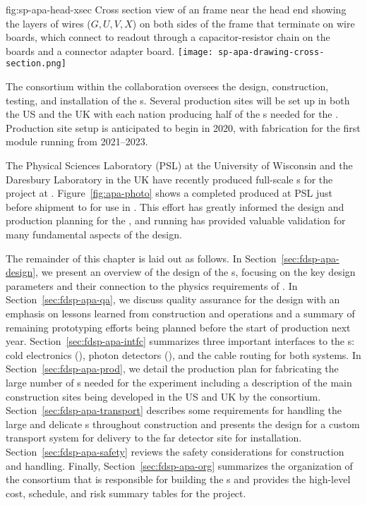 \begin{dunefigure}{fig:sp-apa-head-xsec}
{Cross section view of an  frame near the head end showing the layers of wires ($G,U,V,X$) on both sides of the frame that terminate on wire boards, which connect to  readout  through a capacitor-resistor chain on the  boards and a connector adapter board.} 
\texttt{[image: sp-apa-drawing-cross-section.png]} 
\end{dunefigure} 

The  consortium within the  collaboration oversees the design, construction, testing, and installation of the s. Several  production sites will be set up in both the US and the UK with each nation producing  half of the s needed for the %
.  Production site setup is anticipated to begin in 2020, with  fabrication for the first \nominalmodsize {} module running from 2021--2023.  

The Physical Sciences Laboratory (PSL) at the University of Wisconsin and the Daresbury Laboratory in the UK have recently produced full-scale s for the  project at . Figure~\ref{fig:apa-photo} shows a completed  produced at PSL just before shipment to  for use in . This effort has greatly informed the design and production planning for the  , and  running has provided valuable validation for many fundamental aspects of the   design. 


The remainder of this chapter is laid out as follows.  In Section~\ref{sec:fdsp-apa-design}, we present an overview of the design of the s, focusing on the key design parameters and their connection to the physics requirements of .  In Section~\ref{sec:fdsp-apa-qa}, we discuss quality assurance for the design with an emphasis on lessons learned from  construction and operations and a summary of remaining prototyping efforts being planned before the start of production next year. Section~\ref{sec:fdsp-apa-intfc} summarizes three important interfaces to the s:  cold electronics (), photon detectors (), and the cable routing for both systems.  In Section~\ref{sec:fdsp-apa-prod}, we detail the production plan for fabricating the large number of s needed for the experiment including a description of the main construction sites being developed in the US and UK by the  consortium.  Section~\ref{sec:fdsp-apa-transport} describes some requirements for handling the large and delicate s throughout construction and presents the design for a custom transport system for delivery to the far detector site for installation. Section~\ref{sec:fdsp-apa-safety} reviews the safety considerations for  construction and handling. Finally,  Section~\ref{sec:fdsp-apa-org} summarizes the organization of the  consortium that is responsible for building the s and provides the high-level cost, schedule, and risk summary tables for the project. 

